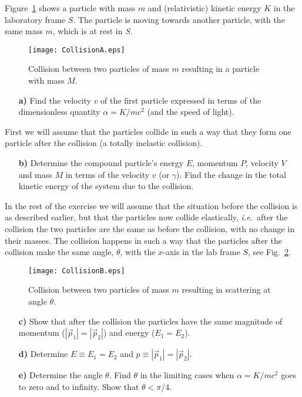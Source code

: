 \documentclass[11pt,a4paper]{report}
\newcounter{excount}[chapter]
\newenvironment{exercise}[1][]{\addtocounter{excount}{1} \noindent {\bf Problem
    \arabic{excount} \ \ #1}\hspace{2mm}}{\vspace{4mm}}
\begin{document}
\begin{exercise}
Figure~\ref{fig:collisionA} shows a particle with mass $m$ and (relativistic) kinetic energy $K$ in the laboratory frame $S$. The particle is moving towards another particle, with the same mass $m$, which is at rest in $S$.

\begin{figure}[h]
\begin{center}
\texttt{[image: CollisionA.eps]}
\end{center}
\caption{Collision between two particles of mass $m$ resulting in a particle with mass $M$.}
\label{fig:collisionA}
\end{figure}

\begin{itemize}
\item[\bf a)] Find the velocity $v$ of the first particle expressed in terms of the dimensionless quantity $\alpha=K/mc^2$ (and the speed of light).
\end{itemize}

First we will assume that the particles collide in  such a way that they form one particle after the collision (a totally inelastic collision).
\begin{itemize}
\item[\bf b)] Determine the compound particle's energy $E$, momentum $P$, velocity $V$ and mass $M$ in terms of the velocity $v$ (or $\gamma$). Find the change in the total kinetic energy of the system due to the collision.
\end{itemize}

In the rest of the exercise we will assume that the situation before the collision is as described earlier, but that the particles now collide elastically, {\it i.e.}\ after the collision the two particles are the same as before the collision, with no change in their masses. The collision happens in such a way that the particles after the collision make the same angle, $\theta$, with the $x$-axis in the lab frame $S$, see Fig.~\ref{fig:CollisionB}.

\begin{figure}[h]
\begin{center}
\texttt{[image: CollisionB.eps]}
\end{center}
\caption{Collision between two particles of mass $m$ resulting in scattering at angle $\theta$.}
\label{fig:CollisionB}
\end{figure}

\begin{itemize}
\item[\bf c)] Show that after the collision the particles have the same magnitude of momentum ($|\vec p_1|=|\vec p_2|$) and energy ($E_1=E_2$).
\item[\bf d)] Determine $E\equiv E_1=E_2$ and $p\equiv |\vec p_1|=|\vec p_2|$.
\item[\bf e)] Determine the angle $\theta$. Find $\theta$ in the limiting cases when $\alpha=K/mc^2$ goes to zero and to infinity. Show that $\theta<\pi/4$. 
\end{itemize}
\end{exercise}



 
\end{document}
